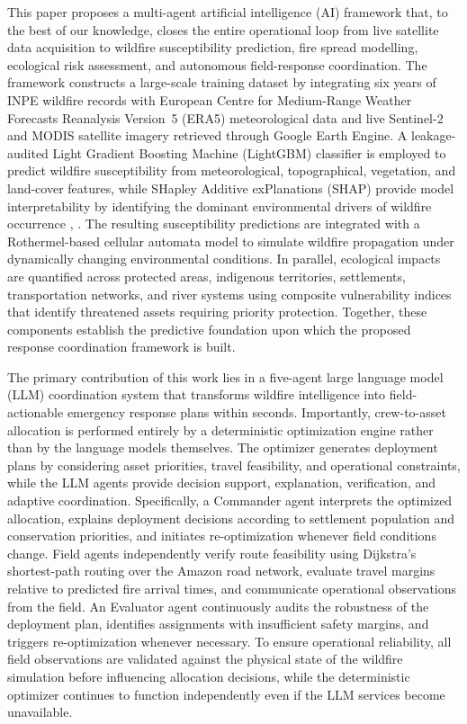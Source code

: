 \documentclass{ieeeaccess}
\begin{document}
This paper proposes a multi-agent artificial intelligence (AI) framework that, to the best of our knowledge, closes the entire operational loop from live satellite data acquisition to wildfire susceptibility prediction, fire spread modelling, ecological risk assessment, and autonomous field-response coordination. The framework constructs a large-scale training dataset by integrating six years of INPE wildfire records with European Centre for Medium-Range Weather Forecasts Reanalysis Version~5 (ERA5) meteorological data and live Sentinel-2 and MODIS satellite imagery retrieved through Google Earth Engine. A leakage-audited Light Gradient Boosting Machine (LightGBM) classifier is employed to predict wildfire susceptibility from meteorological, topographical, vegetation, and land-cover features, while SHapley Additive exPlanations (SHAP) provide model interpretability by identifying the dominant environmental drivers of wildfire occurrence \cite{3}, \cite{4}. The resulting susceptibility predictions are integrated with a Rothermel-based cellular automata model to simulate wildfire propagation under dynamically changing environmental conditions. In parallel, ecological impacts are quantified across protected areas, indigenous territories, settlements, transportation networks, and river systems using composite vulnerability indices that identify threatened assets requiring priority protection. Together, these components establish the predictive foundation upon which the proposed response coordination framework is built.

The primary contribution of this work lies in a five-agent large language model (LLM) coordination system that transforms wildfire intelligence into field-actionable emergency response plans within seconds. Importantly, crew-to-asset allocation is performed entirely by a deterministic optimization engine rather than by the language models themselves. The optimizer generates deployment plans by considering asset priorities, travel feasibility, and operational constraints, while the LLM agents provide decision support, explanation, verification, and adaptive coordination. Specifically, a Commander agent interprets the optimized allocation, explains deployment decisions according to settlement population and conservation priorities, and initiates re-optimization whenever field conditions change. Field agents independently verify route feasibility using Dijkstra's shortest-path routing over the Amazon road network, evaluate travel margins relative to predicted fire arrival times, and communicate operational observations from the field. An Evaluator agent continuously audits the robustness of the deployment plan, identifies assignments with insufficient safety margins, and triggers re-optimization whenever necessary. To ensure operational reliability, all field observations are validated against the physical state of the wildfire simulation before influencing allocation decisions, while the deterministic optimizer continues to function independently even if the LLM services become unavailable.
\end{document}
